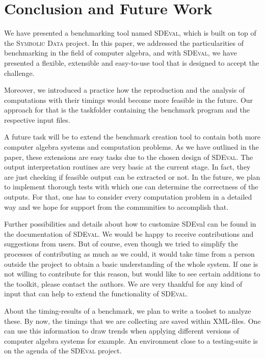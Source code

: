 \documentclass[12pt]{article}
\begin{document}
\section{Conclusion and Future Work}
\label{sctn:Conclusion}

We have presented a benchmarking tool named \textsc{SDEval}, which is built on
top of the \textsc{Symbolic Data} project. In this paper, we addressed the
particularities of benchmarking in the field of computer algebra, and with
\textsc{SDEval}, we have presented a flexible, extensible and easy-to-use tool
that is designed to accept the challenge.

Moreover, we introduced a practice how the reproduction and the analysis of
computations with their timings would become more feasible in the future.  Our
approach for that is the taskfolder containing the benchmark program and the
respective input files.

A future task will be to extend the benchmark creation tool to contain both
more computer algebra systems and computation problems. As we have outlined in
the paper, these extensions are easy tasks due to the chosen design of
\textsc{SDEval}.  The output interpretation routines are very basic at the
current stage. In fact, they are just checking if feasible output can be
extracted or not. In the future, we plan to implement thorough tests with which
one can determine the correctness of the outputs. For that, one has to consider
every computation problem in a detailed way and we hope for support from the
communities to accomplish that.

Further possibilities and details about how to customize SDEval can be found in
the documentation of \textsc{SDEval}. We would be happy to receive
contributions and suggestions from users.  But of course, even though we tried
to simplify the processes of contributing as much as we could, it would take
time from a person outside the project to obtain a basic understanding of the
whole system.  If one is not willing to contribute for this reason, but would
like to see certain additions to the toolkit, please contact the authors. We
are very thankful for any kind of input that can help to extend the
functionality of \textsc{SDEval}.

About the timing-results of a benchmark, we plan to write a toolset to analyze
these. By now, the timings that we are collecting are saved within
\textsc{XML}-files. One can use this information to draw trends when applying
different versions of computer algebra systems for example. An environment
close to a testing-suite is on the agenda of the \textsc{SDEval} project.
\end{document}

